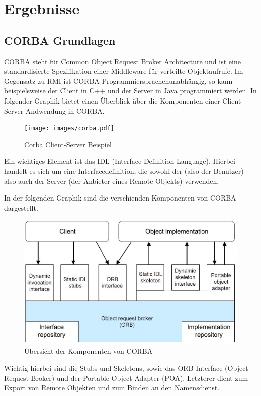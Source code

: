 
\section{Ergebnisse}
\label{sec:Ergebnisse}

\subsection{CORBA Grundlagen}
CORBA steht f\"ur Common Object Request Broker Architecture und ist eine standardisierte Spezifikation einer Middleware f\"ur verteilte Objektaufrufe.
Im Gegensatz zu RMI ist CORBA Programmiersprachenunabh\"angig, so kann beispielsweise der Client in C++ und der Server in Java programmiert werden.
In folgender Graphik bietet einen \"Uberblick \"uber die Komponenten einer Client-Server Andwendung in CORBA.

\begin{figure}[H]
	\begin{center}
		\texttt{[image: images/corba.pdf]}
		\caption{Corba Client-Server Beispiel\cite{corba-client-server}}
		\label{broker}
	\end{center}
\end{figure}

Ein wichtiges Element ist das IDL (Interface Definition Language).
Hierbei handelt es sich um eine Interfacedefinition, die sowohl der (also der Benutzer) also auch der Server (der Anbieter eines Remote Objekts) verwenden.

In der folgenden Graphik sind die verschienden Komponenten von CORBA dargestellt.
\begin{figure}[H]
	\begin{center}
		\includegraphics[width=0.5\linewidth]{images/corba.jpg}
		\caption{\"Ubersicht der Komponenten von CORBA \cite{corba-components}}
		\label{broker}
	\end{center}
\end{figure}

Wichtig hierbei sind die Stubs und Skeletons, sowie das ORB-Interface (Object Request Broker) und der Portable Object Adapter (POA).
Letzterer dient zum Export von Remote Objekten und zum Binden an den Namensdienst.

